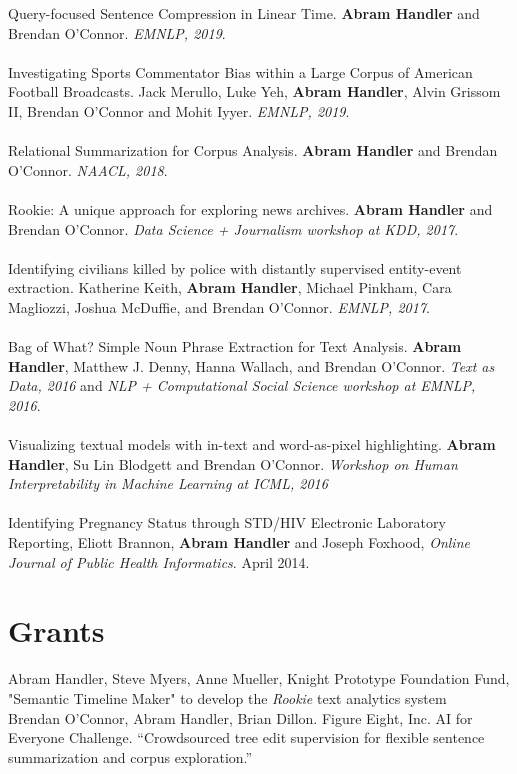 \documentclass[10pt, a4paper]{article}
\newcommand{\years}[1]{\marginnote{\normalsize #1}}
\begin{document}
Query-focused Sentence Compression in Linear Time. \textbf{Abram Handler} and Brendan O'Connor. \textit{EMNLP, 2019}.\\ \\
Investigating Sports Commentator Bias within a Large Corpus of American Football Broadcasts. Jack Merullo, Luke Yeh, \textbf{Abram Handler}, Alvin Grissom II, Brendan O'Connor and Mohit Iyyer. \textit{EMNLP, 2019}.\\ \\
Relational Summarization for Corpus Analysis. \textbf{Abram Handler} and Brendan O'Connor. \textit{NAACL, 2018}.\\ \\
Rookie: A unique approach for exploring news archives. \textbf{Abram Handler} and Brendan O'Connor. \textit{Data Science + Journalism workshop at KDD, 2017}.\\ \\
Identifying civilians killed by police with distantly supervised entity-event extraction. Katherine Keith, \textbf{Abram Handler}, Michael Pinkham, Cara Magliozzi, Joshua McDuffie, and Brendan O'Connor. \textit{EMNLP, 2017}. \\ \\
Bag of What? Simple Noun Phrase Extraction for Text Analysis. \textbf{Abram Handler}, Matthew J. Denny, Hanna Wallach, and Brendan O'Connor. \textit{Text as Data, 2016} and \textit{NLP + Computational Social Science workshop at EMNLP, 2016}.\\ \\
Visualizing textual models with in-text and word-as-pixel highlighting.  \textbf{Abram Handler}, Su Lin Blodgett and Brendan O'Connor. \textit{Workshop on Human Interpretability in Machine Learning at ICML, 2016} \\ \\
Identifying Pregnancy Status through STD/HIV Electronic Laboratory Reporting,  Eliott Brannon, \textbf{Abram Handler} and Joseph Foxhood, \textit{Online Journal of Public Health Informatics}. April 2014.

\vspace{-.7cm}

\section*{Grants}
\years{2015} Abram Handler, Steve Myers, Anne Mueller, Knight Prototype Foundation Fund, "Semantic Timeline Maker" to develop the \textit{Rookie} text analytics system \\
\years{2018-2019} Brendan O’Connor, Abram Handler, Brian Dillon.  Figure Eight, Inc.  AI for Everyone Challenge.  “Crowdsourced tree edit supervision for flexible sentence summarization and corpus exploration.”
\end{document}
